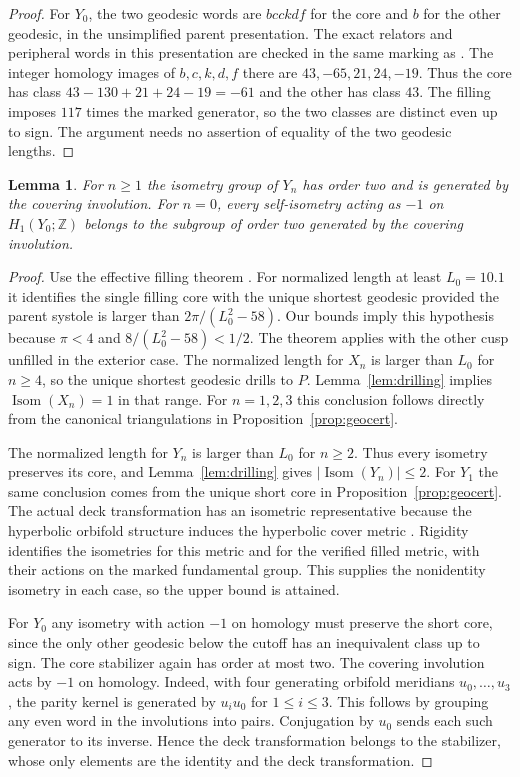 \documentclass[11pt]{article}
\newtheorem{lemma}[theorem]{Lemma}
\newcommand{\Isom}{\operatorname{Isom}}
\begin{document}
\begin{proof}
For $Y_0$, the two geodesic words are $bcckdf$ for the core and $b$
for the other geodesic, in the unsimplified parent presentation.
The exact relators and peripheral words in this presentation are
checked in the same marking as \cite{scope}. The integer homology
images of $b,c,k,d,f$ there are $43,-65,21,24,-19$. Thus the core
has class $43-130+21+24-19=-61$ and the other has class $43$.
The filling imposes $117$ times the marked generator, so the two
classes are distinct even up to sign. The argument needs no assertion
of equality of the two geodesic lengths.
\end{proof}

\begin{lemma}\label{lem:cores}
For $n\ge1$ the isometry group of $Y_n$ has order two and is generated
by the covering involution. For $n=0$, every self-isometry acting
as $-1$ on $H_1(Y_0;\mathbb Z)$ belongs to the subgroup of order two
generated by the covering involution.
\end{lemma}
\begin{proof}
Use the effective filling theorem \cite[Lemma~7.26 and
Theorem~7.28]{fps}. For normalized length at least $L_0=10.1$ it
identifies the single filling core with the unique shortest geodesic
provided the parent systole is larger than
$2\pi/(L_0^2-58)$. Our bounds imply this hypothesis because $\pi<4$
and $8/(L_0^2-58)<1/2$. The theorem applies with the other cusp
unfilled in the exterior case. The normalized length for $X_n$ is
larger than $L_0$ for $n\ge4$, so the unique shortest geodesic drills
to $P$. Lemma~\ref{lem:drilling} implies $\Isom(X_n)=1$ in that range.
For $n=1,2,3$ this conclusion follows directly from the canonical
triangulations in Proposition~\ref{prop:geocert}.

The normalized length for $Y_n$ is larger than $L_0$ for $n\ge2$.
Thus every isometry preserves its core, and Lemma~\ref{lem:drilling}
gives $|\Isom(Y_n)|\le2$. For $Y_1$ the same conclusion comes from
the unique short core in Proposition~\ref{prop:geocert}. The actual
deck transformation has an isometric representative because the
hyperbolic orbifold structure induces the hyperbolic cover metric
\cite{scope}. Rigidity identifies the isometries for this metric and
for the verified filled metric, with their actions on the marked
fundamental group. This supplies the nonidentity isometry in each
case, so the upper bound is attained.

For $Y_0$ any isometry with action $-1$ on homology must preserve
the short core, since the only other geodesic below the cutoff has
an inequivalent class up to sign. The core stabilizer again has order
at most two. The covering involution acts by $-1$ on homology.
Indeed, with four generating orbifold meridians $u_0,\dots,u_3$,
the parity kernel is generated by $u_i u_0$ for $1\le i\le3$.
This follows by grouping any even word in the involutions into pairs.
Conjugation by $u_0$ sends each such generator to its inverse.
Hence the deck transformation belongs to the stabilizer, whose
only elements are the identity and the deck transformation.
\end{proof}
\end{document}
